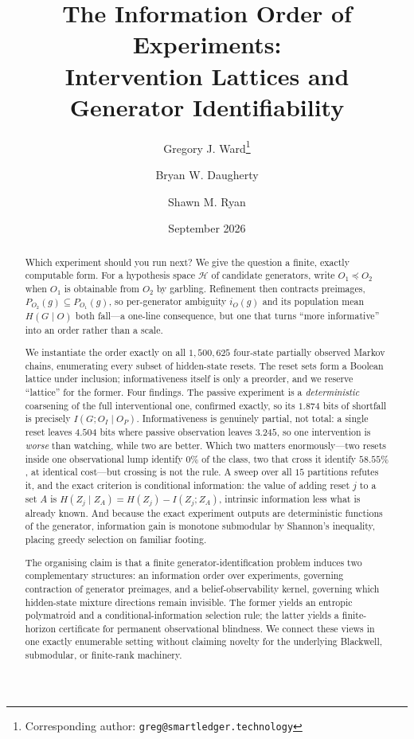 \documentclass[11pt]{article}
\title{\bf The Information Order of Experiments:\\
Intervention Lattices and Generator Identifiability}
\author{
  Gregory J. Ward\thanks{Corresponding author: \texttt{greg@smartledger.technology}}
  \and Bryan W. Daugherty
  \and Shawn M. Ryan
}
\date{September 2026}
\newcommand{\HH}{\ensuremath{\mathcal{H}}}
\begin{document}
\maketitle

\begin{abstract}
Which experiment should you run next? We give the question a finite, exactly computable
form. For a hypothesis space $\HH$ of candidate generators, write $O_1 \preceq O_2$ when
$O_1$ is obtainable from $O_2$ by garbling. Refinement then contracts preimages,
$P_{O_2}(g) \subseteq P_{O_1}(g)$, so per-generator ambiguity $i_O(g)$ and its population
mean $H(G \mid O)$ both fall---a one-line consequence, but one that turns ``more
informative'' into an order rather than a scale.

We instantiate the order exactly on all $1{,}500{,}625$ four-state partially observed
Markov chains, enumerating every subset of hidden-state resets. The reset sets form a
Boolean lattice under inclusion; informativeness itself is only a preorder, and we reserve
``lattice'' for the former. Four findings. The
passive experiment is a \emph{deterministic} coarsening of the full interventional one,
confirmed exactly, so its $1.874$ bits of shortfall is precisely
$I(G; O_I \mid O_P)$. Informativeness is genuinely partial, not total: a single reset
leaves $4.504$ bits where passive observation leaves $3.245$, so one intervention is
\emph{worse} than watching, while two are better. Which two matters enormously---two resets inside one observational
lump identify $0\%$ of the class, two that cross it identify $58.55\%$, at identical
cost---but crossing is not the rule. A sweep over all $15$ partitions refutes it, and the
exact criterion is conditional information: the value of adding reset $j$ to a set $A$ is
$H(Z_j \mid Z_A) = H(Z_j) - I(Z_j; Z_A)$, intrinsic information less what is already
known. And because the exact experiment outputs are
deterministic functions of the generator, information gain is monotone submodular by
Shannon's inequality, placing greedy selection on familiar footing.

The organising claim is that a finite generator-identification problem induces two
complementary structures: an information order over experiments, governing contraction of
generator preimages, and a belief-observability kernel, governing which hidden-state
mixture directions remain invisible. The former yields an entropic polymatroid and a
conditional-information selection rule; the latter yields a finite-horizon certificate for
permanent observational blindness. We connect these views in one exactly enumerable setting
without claiming novelty for the underlying Blackwell, submodular, or finite-rank
machinery.
\end{abstract}
\end{document}
